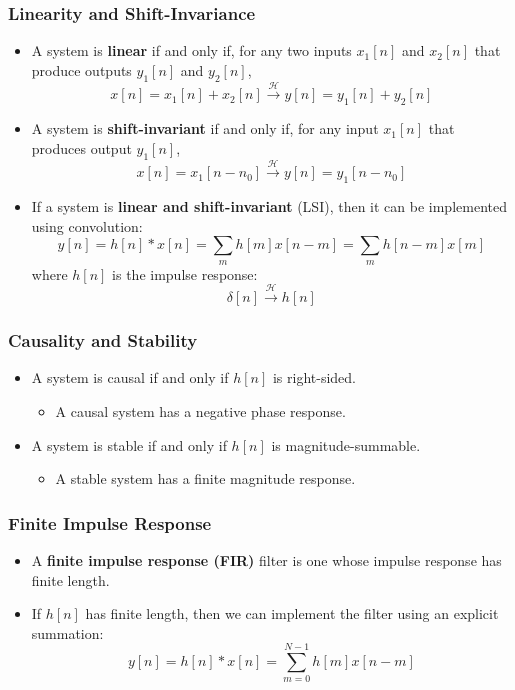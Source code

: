 \documentclass{beamer}
\begin{document}
\begin{frame}
  \frametitle{Linearity and Shift-Invariance}
  \begin{itemize}
  \item A system is {\bf linear} if and only if, for any two inputs
    $x_1[n]$ and $x_2[n]$ that produce outputs $y_1[n]$ and $y_2[n]$,
    \[
    x[n]=x_1[n]+x_2[n] \stackrel{\mathcal H}{\longrightarrow}  y[n]=y_1[n]+y_2[n]
    \]
  \item A system is {\bf shift-invariant} if and only if, for any input
    $x_1[n]$ that produces output $y_1[n]$,
    \[
    x[n]=x_1[n-n_0] \stackrel{\mathcal H}{\longrightarrow}  y[n]=y_1[n-n_0]
    \]
  \item If a system is {\bf linear and shift-invariant} (LSI), then it
    can be implemented using convolution:
    \[
    y[n] = h[n]\ast x[n]=\sum_m h[m] x[n-m] = \sum_m h[n-m] x[m]
    \]
    where $h[n]$ is the impulse response:
    \[
    \delta[n] \stackrel{\mathcal H}{\longrightarrow}  h[n]
    \]
  \end{itemize}
\end{frame}

\begin{frame}
  \frametitle{Causality and Stability}

  \begin{itemize}
  \item A system is causal if and only if $h[n]$ is right-sided.
    \begin{itemize}
    \item A causal system has a negative phase response.
    \end{itemize}
  \item A system is stable if and only if $h[n]$ is
    magnitude-summable.
    \begin{itemize}
    \item A stable system has a finite magnitude response.
    \end{itemize}
  \end{itemize}
\end{frame}

\begin{frame}
  \frametitle{Finite Impulse Response}

  \begin{itemize}
    \item A {\bf finite impulse response (FIR)} filter is one whose
      impulse response has finite length.
    \item If $h[n]$ has finite length, then we can implement the filter
      using an explicit summation:
      \[
      y[n] = h[n]\ast x[n]=\sum_{m=0}^{N-1} h[m] x[n-m]
      \]
  \end{itemize}
\end{frame}
\end{document}
